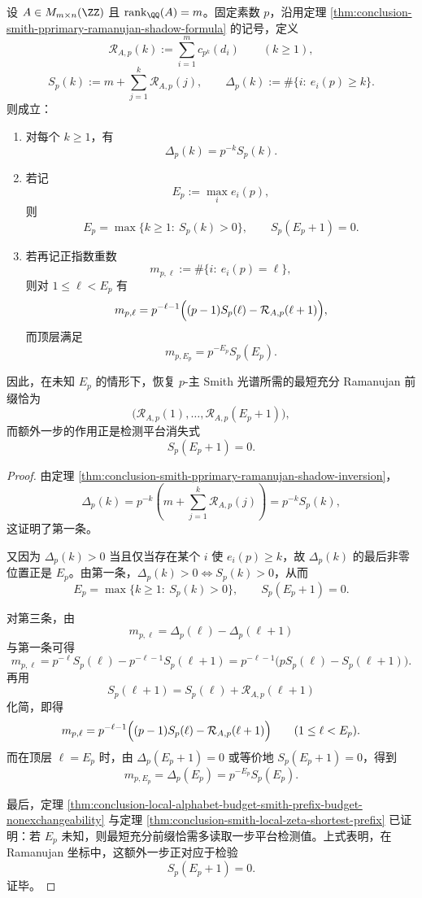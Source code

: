 \begin{theorem}\label{thm:conclusion-smith-ramanujan-partialsum-plateau}
设 \(A\in M_{m\times n}(\ZZ)\) 且 \(\operatorname{rank}_{\QQ}(A)=m\)。固定素数 \(p\)，沿用定理 \ref{thm:conclusion-smith-pprimary-ramanujan-shadow-formula} 的记号，定义
\[
\mathcal R_{A,p}(k):=\sum_{i=1}^{m}c_{p^k}(d_i)
\qquad(k\ge 1),
\]
\[
S_p(k):=m+\sum_{j=1}^{k}\mathcal R_{A,p}(j),
\qquad
\Delta_p(k):=\#\{i:\ e_i(p)\ge k\}.
\]
则成立：
\begin{enumerate}
  \item 对每个 \(k\ge 1\)，有
  \[
  \Delta_p(k)=p^{-k}S_p(k).
  \]
  \item 若记
  \[
  E_p:=\max_i e_i(p),
  \]
  则
  \[
  E_p=\max\{k\ge 1:\ S_p(k)>0\},
  \qquad
  S_p(E_p+1)=0.
  \]
  \item 若再记正指数重数
  \[
  m_{p,\ell}:=\#\{i:\ e_i(p)=\ell\},
  \]
  则对 \(1\le \ell<E_p\) 有
  \[
  m_{p,\ell}
  =
  p^{-\ell-1}\Bigl((p-1)S_p(\ell)-\mathcal R_{A,p}(\ell+1)\Bigr),
  \]
  而顶层满足
  \[
  m_{p,E_p}=p^{-E_p}S_p(E_p).
  \]
\end{enumerate}
因此，在未知 \(E_p\) 的情形下，恢复 \(p\)-主 Smith 光谱所需的最短充分 Ramanujan 前缀恰为
\[
\bigl(\mathcal R_{A,p}(1),\dots,\mathcal R_{A,p}(E_p+1)\bigr),
\]
而额外一步的作用正是检测平台消失式
\[
S_p(E_p+1)=0.
\]
\end{theorem}

\begin{proof}
由定理 \ref{thm:conclusion-smith-pprimary-ramanujan-shadow-inversion}，
\[
\Delta_p(k)=p^{-k}\left(m+\sum_{j=1}^{k}\mathcal R_{A,p}(j)\right)=p^{-k}S_p(k),
\]
这证明了第一条。

又因为 \(\Delta_p(k)>0\) 当且仅当存在某个 \(i\) 使 \(e_i(p)\ge k\)，故 \(\Delta_p(k)\) 的最后非零位置正是 \(E_p\)。由第一条，\(\Delta_p(k)>0\iff S_p(k)>0\)，从而
\[
E_p=\max\{k\ge 1:\ S_p(k)>0\},
\qquad
S_p(E_p+1)=0.
\]

对第三条，由
\[
m_{p,\ell}=\Delta_p(\ell)-\Delta_p(\ell+1)
\]
与第一条可得
\[
m_{p,\ell}
=
p^{-\ell}S_p(\ell)-p^{-\ell-1}S_p(\ell+1)
=
p^{-\ell-1}\bigl(pS_p(\ell)-S_p(\ell+1)\bigr).
\]
再用
\[
S_p(\ell+1)=S_p(\ell)+\mathcal R_{A,p}(\ell+1)
\]
化简，即得
\[
m_{p,\ell}
=
p^{-\ell-1}\Bigl((p-1)S_p(\ell)-\mathcal R_{A,p}(\ell+1)\Bigr)
\qquad(1\le \ell<E_p).
\]
而在顶层 \(\ell=E_p\) 时，由 \(\Delta_p(E_p+1)=0\) 或等价地 \(S_p(E_p+1)=0\)，得到
\[
m_{p,E_p}=\Delta_p(E_p)=p^{-E_p}S_p(E_p).
\]

最后，定理 \ref{thm:conclusion-local-alphabet-budget-smith-prefix-budget-nonexchangeability} 与定理 \ref{thm:conclusion-smith-local-zeta-shortest-prefix} 已证明：若 \(E_p\) 未知，则最短充分前缀恰需多读取一步平台检测值。上式表明，在 Ramanujan 坐标中，这额外一步正对应于检验
\[
S_p(E_p+1)=0.
\]
证毕。
\end{proof}

